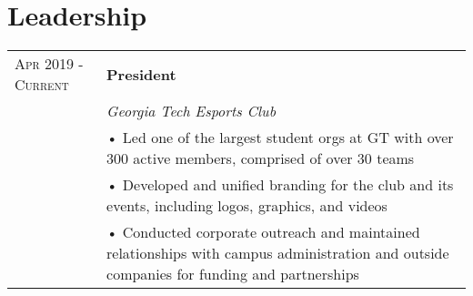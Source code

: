 \documentclass[a4paper,11pt]{article}
\newenvironment{rsection}[1]
  {
    \section{#1}
    \begin{tabular}{>{\raggedleft\arraybackslash}p{3.7cm}|p{14.7cm}}
   } {
    \end{tabular}
  }
\newcommand{\rheader}[2]{
  \textsc{#1} & \textbf{#2}
}
\newcommand{\rdesc}[1]{
  \\&\small{\emph{#1}\vspace{2pt} }
}
\newcommand{\ritem}[2][ • ]{\\[-2pt]& \footnotesize{#1#2}}
\begin{document}
\vspace{-2pt}

\begin{rsection}{Leadership}
  \rheader{Apr 2019 - Current}{President}
  \rdesc{Georgia Tech Esports Club}
  \ritem{Led one of the largest student orgs at GT with over 300 active members, comprised of over 30 teams}
  \ritem{Developed and unified branding for the club and its events, including logos, graphics, and videos}
  \ritem{Conducted corporate outreach and maintained relationships with campus administration and outside
companies for funding and partnerships}
\end{rsection}
\end{document}
